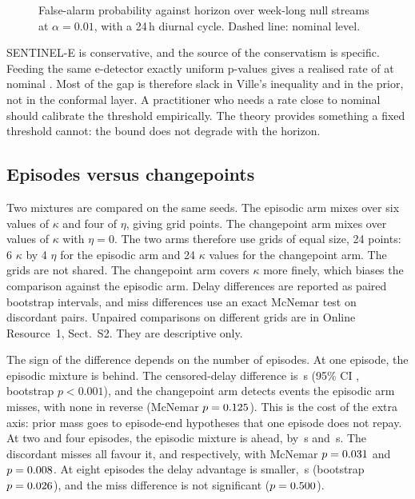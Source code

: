 \begin{figure}[t]
  \centering
  \caption{False-alarm probability against horizon over week-long null streams at
  $\alpha=0.01$, with a 24\,h diurnal cycle. Dashed line: nominal level.}
  \label{fig:horizon-week}
\end{figure}


SENTINEL-E is conservative, and the source of the conservatism is specific.
Feeding the same e-detector exactly uniform p-values gives a realised rate of
\ValidityPfaOracleLoose{} at nominal \ValidityAlphaLoose. Most of the gap is
therefore slack in Ville's inequality and in the prior, not in the conformal
layer. A practitioner who needs a rate close to nominal should calibrate the
threshold empirically. The theory provides something a fixed threshold cannot:
the bound does not degrade with the horizon.

\subsection{Episodes versus changepoints}
\label{sec:episodes}

Two mixtures are compared on the same seeds. The episodic arm mixes over six
values of $\kappa$ and four of $\eta$, giving \EpiGridPoints{} grid points. The
changepoint arm mixes over \EpiGridPoints{} values of $\kappa$ with $\eta=0$.
The two arms therefore use grids of equal size, 24 points: 6 $\kappa$ by 4 $\eta$
for the episodic arm and 24 $\kappa$ values for the changepoint arm. The grids are
not shared. The changepoint arm covers $\kappa$ more finely, which biases the
comparison against the episodic arm. Delay differences are reported as paired bootstrap intervals, and miss
differences use an exact McNemar test on discordant pairs. Unpaired comparisons
on different grids are in Online Resource~1, Sect.~S2. They are descriptive only.


The sign of the difference depends on the number of episodes. At one episode,
the episodic mixture is behind. The censored-delay difference is
\EpiPairedDiffOne\,s (95\% CI \EpiPairedCIOne{}, bootstrap $p<0.001$),
and the changepoint arm detects \EpiPairedDiscordantOne{} events the episodic arm
misses, with none in reverse (McNemar $p=0.125$). This is the
cost of the extra axis: prior mass goes to episode-end hypotheses that one
episode does not repay. At two and four episodes, the episodic mixture is ahead, by
\EpiPairedDiffTwo\,s and \EpiPairedDiffMid\,s. The discordant misses all favour
it, \EpiPairedDiscordantTwo{} and \EpiPairedDiscordantMid{} respectively, with
McNemar $p=0.031$ and $p=0.008$. At eight episodes
the delay advantage is smaller, \EpiPairedDiffMany\,s (bootstrap
$p=0.026$), and the miss difference is not significant
($p=0.500$).


